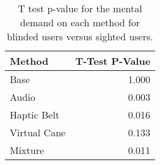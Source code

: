 
\begin{table}[!htb]
\centering
\caption{T test p-value for the mental demand on each method for blinded users versus sighted users.}
\label{tab:ttest_mental_demand}
\begin{tabular}{lr}
\toprule
      Method &  T-Test P-Value \\
\midrule
        Base &           1.000 \\
       Audio &           0.003 \\
 Haptic Belt &           0.016 \\
Virtual Cane &           0.133 \\
     Mixture &           0.011 \\
\bottomrule
\end{tabular}
\end{table}

